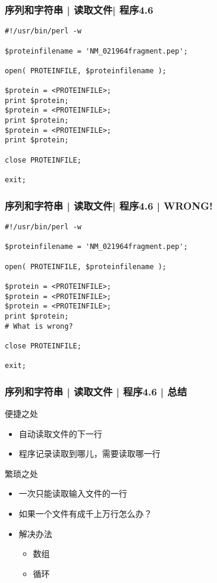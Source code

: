 \begin{frame}[fragile]
  \frametitle{序列和字符串 | 读取文件| \alert{程序4.6}}
  \vspace{-1.5em}
\begin{lstlisting}[basicstyle=\small\tt]
#!/usr/bin/perl -w

$proteinfilename = 'NM_021964fragment.pep';

open( PROTEINFILE, $proteinfilename );

$protein = <PROTEINFILE>;
print $protein;
$protein = <PROTEINFILE>;
print $protein;
$protein = <PROTEINFILE>;
print $protein;

close PROTEINFILE;

exit;
\end{lstlisting}
\end{frame}

\begin{frame}[fragile]
  \frametitle{序列和字符串 | 读取文件| 程序4.6 | WRONG!}
  \vspace{-1.5em}
\begin{lstlisting}[basicstyle=\small\tt]
#!/usr/bin/perl -w

$proteinfilename = 'NM_021964fragment.pep';

open( PROTEINFILE, $proteinfilename );

$protein = <PROTEINFILE>;
$protein = <PROTEINFILE>;
$protein = <PROTEINFILE>;
print $protein;
# What is wrong?

close PROTEINFILE;

exit;
\end{lstlisting}
\end{frame}

\begin{frame}[fragile]
  \frametitle{序列和字符串 | 读取文件 | 程序4.6 | 总结}
  \begin{block}{便捷之处}
    \begin{itemize}
      \item 自动读取文件的下一行
      \item 程序记录读取到哪儿，需要读取哪一行
    \end{itemize}
  \end{block}
  \pause
  \begin{block}{繁琐之处}
    \begin{itemize}
      \item 一次只能读取输入文件的一行
      \item 如果一个文件有成千上万行怎么办？
      \item 解决办法
        \begin{itemize}
          \item 数组
          \item 循环
        \end{itemize}
    \end{itemize}
  \end{block}
\end{frame}

